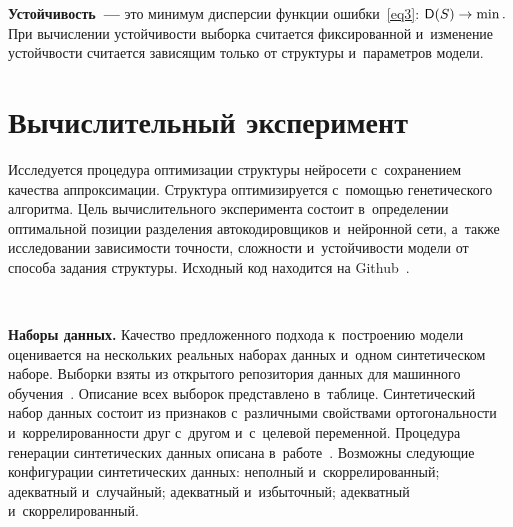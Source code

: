 \begin{multicols}{2}
\textbf{Устойчивость~---} это минимум дисперсии функции ошибки~\eqref{eq3}:
$\mathsf{D}(S) \hm\rightarrow \min.$
При вычислении устойчивости выборка считается фиксированной и~изменение 
устойчвости считается зависящим только от структуры и~параметров модели.

\section{Вычислительный эксперимент}

Исследуется процедура оптимизации структуры нейросети с~сохранением качества 
аппроксимации. Структура оптимизируется с~помощью генетического алгоритма. 
Цель вычислительного эксперимента состоит в~определении оптимальной позиции 
разделения автокодировщиков и~нейронной сети, а~также исследовании 
зависимости точ\-ности, слож\-ности и~устой\-чи\-вости модели от способа задания 
структуры. Исходный код находится на Github~\cite{twentythree}.


%

\begin{figure*}[b] %
\vspace*{6pt}
    \begin{center}  
  \mbox{%
 \epsfxsize=162.76mm 
 }
\end{center}
\vspace*{-11pt}
\label{fig:blobs}
\end{figure*}



\textbf{Наборы данных.}
Качество предложенного подхода к~построению модели оценивается на нескольких 
реальных наборах данных и~одном синтетическом наборе. Выборки взяты из 
открытого \mbox{репозитория} данных для машинного обучения~\cite{seventh}.  Описание 
всех выборок представлено в~таблице. %
Синтетический набор данных состоит из признаков с~различными свойствами 
ортогональности и~коррелированности друг с~другом и~с~целевой переменной. 
Процедура генерации синтетических данных описана в~работе~\cite{first}. 
Возможны следующие конфигурации синтетических данных: неполный 
и~скоррелированный; адекватный и~случайный; адекватный и~избыточный; адекватный и~скоррелированный.


\end{multicols}
